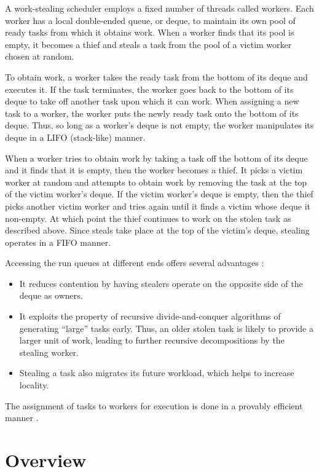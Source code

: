 A work-stealing scheduler employs a fixed number of threads called
workers. Each worker has a local double-ended queue, or deque, to
maintain its own pool of ready tasks from which it obtains work. When
a worker finds that its pool is empty, it becomes a thief and steals a
task from the pool of a victim worker chosen at random.

To obtain work, a worker takes the ready task from the bottom of its
deque and executes it. If the task terminates, the worker goes back to
the bottom of its deque to take off another task upon which it can
work. When assigning a new task to a worker, the worker puts the newly
ready task onto the bottom of its deque. Thus, so long as a worker's
deque is not empty, the worker manipulates its deque in a LIFO
(stack-like) manner.

When a worker tries to obtain work by taking a task off the bottom of
its deque and it finds that it is empty, then the worker becomes a
thief. It picks a victim worker at random and attempts to obtain work
by removing the task at the top of the victim worker's deque. If the
victim worker's deque is empty, then the thief picks another victim
worker and tries again until it finds a victim whose deque it
non-empty. At which point the thief continues to work on the stolen
task as described above. Since steals take place at the top of the
victim's deque, stealing operates in a FIFO manner.

Accessing the run queues at different ends offers several advantages
\cite{Frigo1998}:

\begin{itemize}
\item It reduces contention by having stealers operate on the opposite
  side of the deque as owners.
\item It exploits the property of recursive divide-and-conquer
  algorithms of generating ``large'' tasks early. Thus, an older
  stolen task is likely to provide a larger unit of work, leading to
  further recursive decompositions by the stealing worker.
\item Stealing a task also migrates its future workload, which helps
  to increase locality.
\end{itemize}

The assignment of tasks to workers for execution is done in a provably
efficient manner \cite{Blumofe1995, Blumofe1999}.


\section{Overview}
\label{sec:intro-overview}

